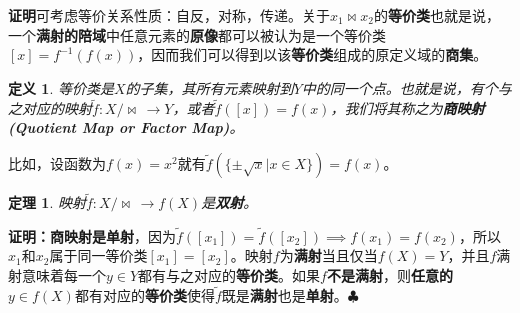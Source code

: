 \documentclass[mathserif,hyperref,UTF8,openany,b5paper]{ctexbook}
\newtheorem{defn}{定义}[section]
\newtheorem{thm}{定理}[section]
\begin{document}
\textbf{证明}可考虑等价关系性质：自反，对称，传递。关于$x_1 \bowtie x_2$的\textbf{等价类}也就是说，一个\textbf{满射的陪域}中任意元素的\textbf{原像}都可以被认为是一个等价类$[x]=f^{-1}(f(x))$，因而我们可以得到以该\textbf{等价类}组成的原定义域的\textbf{商集}。
\begin{defn}
等价类是$X$的子集，其所有元素映射到$Y$中的同一个点。也就是说，有个与之对应的映射$\tilde{f}:X/\bowtie \, \xrightarrow{} Y$，或者$\tilde{f}([x])=f(x)$，我们将其称之为\textbf{商映射(Quotient Map or Factor Map)}。
\end{defn}

比如，设函数为$f(x)=x^2$就有$\tilde{f}(\{\pm \sqrt{x}|x\in X\})=f(x)$。
\begin{thm}
映射$\tilde{f}:X/\bowtie \, \xrightarrow{} f(X)$是\textbf{双射}。
\end{thm}

\textbf{证明：}\textbf{商映射是单射}，因为$\tilde{f}([x_1])=\tilde{f}([x_2])\implies f(x_1) = f(x_2)$，所以$x_1$和$x_2$属于同一等价类$[x_1]=[x_2]$。映射$f$为\textbf{满射}当且仅当$f(X)=Y$，并且$f$满射意味着每一个$y\in Y$都有与之对应的\textbf{等价类}。如果$f$\textbf{不是满射}，则\textbf{任意的}$y\in f(X)$都有对应的\textbf{等价类}使得$\tilde{f}$既是\textbf{满射}也是\textbf{单射}。$\clubsuit$
\end{document}
